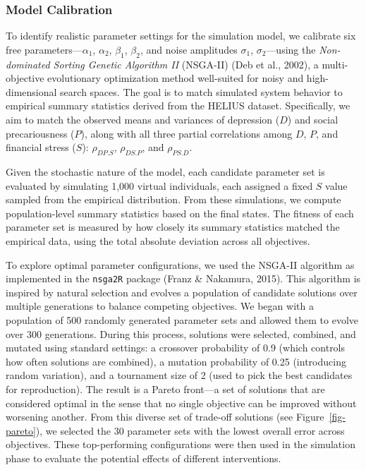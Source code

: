 \documentclass[
]{article}
\begin{document}
\subsubsection{Model Calibration}\label{model-calibration}

To identify realistic parameter settings for the simulation model, we
calibrate six free parameters---\(\alpha_1\), \(\alpha_2\), \(\beta_1\),
\(\beta_2\), and noise amplitudes \(\sigma_1\), \(\sigma_2\)---using the
\emph{Non-dominated Sorting Genetic Algorithm II} (NSGA-II) (Deb et al.,
2002), a multi-objective evolutionary optimization method well-suited
for noisy and high-dimensional search spaces. The goal is to match
simulated system behavior to empirical summary statistics derived from
the HELIUS dataset. Specifically, we aim to match the observed means and
variances of depression (\(D\)) and social precariousness (\(P\)), along
with all three partial correlations among \(D\), \(P\), and financial
stress (\(S\)): \(\rho_{DP.S}\), \(\rho_{DS.P}\), and \(\rho_{PS.D}\).

Given the stochastic nature of the model, each candidate parameter set
is evaluated by simulating 1,000 virtual individuals, each assigned a
fixed \(S\) value sampled from the empirical distribution. From these
simulations, we compute population-level summary statistics based on the
final states. The fitness of each parameter set is measured by how
closely its summary statistics matched the empirical data, using the
total absolute deviation across all objectives.

To explore optimal parameter configurations, we used the NSGA-II
algorithm as implemented in the \texttt{nsga2R} package (Franz \&
Nakamura, 2015). This algorithm is inspired by natural selection and
evolves a population of candidate solutions over multiple generations to
balance competing objectives. We began with a population of 500 randomly
generated parameter sets and allowed them to evolve over 300
generations. During this process, solutions were selected, combined, and
mutated using standard settings: a crossover probability of 0.9 (which
controls how often solutions are combined), a mutation probability of
0.25 (introducing random variation), and a tournament size of 2 (used to
pick the best candidates for reproduction). The result is a Pareto
front---a set of solutions that are considered optimal in the sense that
no single objective can be improved without worsening another. From this
diverse set of trade-off solutions (see Figure~\ref{fig-pareto}), we
selected the 30 parameter sets with the lowest overall error across
objectives. These top-performing configurations were then used in the
simulation phase to evaluate the potential effects of different
interventions.
\end{document}
